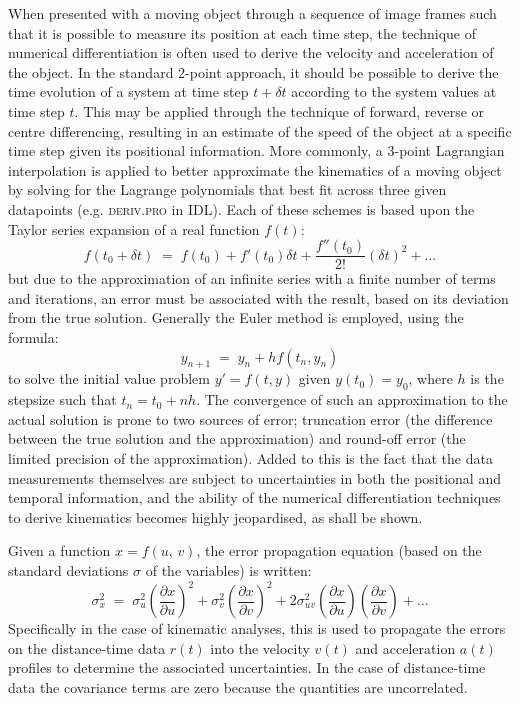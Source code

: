 \documentclass[structabstract]{aa}
\begin{document}
When presented with a moving object through a sequence of image frames such that it is possible to measure its position at each time step, the technique of numerical differentiation is often used to derive the velocity and acceleration of the object. In the standard 2-point approach, it should be possible to derive the time evolution of a system at time step $t+\delta t$ according to the system values at time step $t$. This may be applied through the technique of forward, reverse or centre differencing, resulting in an estimate of the speed of the object at a specific time step given its positional information. More commonly, a 3-point Lagrangian interpolation is applied to better approximate the kinematics of a moving object by solving for the Lagrange polynomials that best fit across three given datapoints (e.g. \textsc{deriv.pro} in IDL). Each of these schemes is based upon the Taylor series expansion of a real function $f(t)$:
\begin{equation}
\label{taylor1}
f(t_0+\delta t) \; = \; f(t_0)+f'(t_0)\delta t +  \frac{f''(t_0)}{2!}(\delta t)^{2}  + ...
\end{equation}
but due to the approximation of an infinite series with a finite number of terms and iterations, an error must be associated with the result, based on its deviation from the true solution. Generally the Euler method is employed, using the formula:
\begin{equation}
y_{n+1} \; = \; y_n + h f(t_n, y_n)
\end{equation}
to solve the initial value problem $y'=f(t,y)$ given $y(t_0)=y_0$, where $h$ is the stepsize such that $t_n=t_0+nh$. The convergence of such an approximation to the actual solution is prone to two sources of error; truncation error (the difference between the true solution and the approximation) and round-off error (the limited precision of the approximation). Added to this is the fact that the data measurements themselves are subject to uncertainties in both the positional and temporal information, and the ability of the numerical differentiation techniques to derive kinematics becomes highly jeopardised, as shall be shown.

Given a function $x=f(u,\,v)$, the error propagation equation (based on the standard deviations $\sigma$ of the variables) is written:
\begin{equation}
\label{eqn_errorprop}
\sigma_x^2 \; = \; \sigma_u^2 \left(\frac{\partial x}{\partial u}\right) ^2 + \sigma_v^2 \left( \frac{\partial x}{\partial v} \right) ^2 + 2 \sigma_{uv}^2 \left( \frac{\partial x}{\partial u} \right) \left( \frac{\partial x}{\partial v} \right) + ...
\end{equation}
Specifically in the case of kinematic analyses, this is used to propagate the errors on the distance-time data $r(t)$ into the velocity $v(t)$ and acceleration $a(t)$ profiles to determine the associated uncertainties. In the case of distance-time data the covariance terms are zero because the quantities are uncorrelated.
\end{document}
